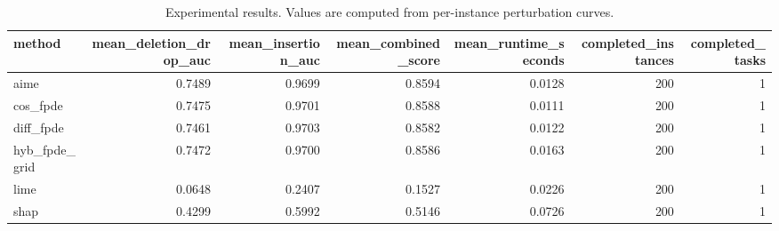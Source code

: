 \begin{table}[t]
\caption{Experimental results. Values are computed from per-instance perturbation curves.}
\label{tab:main_results_computed}
\centering
\begin{tabular}{lrrrrrr}
\toprule
method & mean\_deletion\_drop\_auc & mean\_insertion\_auc & mean\_combined\_score & mean\_runtime\_seconds & completed\_instances & completed\_tasks \\
\midrule
aime & 0.7489 & 0.9699 & 0.8594 & 0.0128 & 200 & 1 \\
cos\_fpde & 0.7475 & 0.9701 & 0.8588 & 0.0111 & 200 & 1 \\
diff\_fpde & 0.7461 & 0.9703 & 0.8582 & 0.0122 & 200 & 1 \\
hyb\_fpde\_grid & 0.7472 & 0.9700 & 0.8586 & 0.0163 & 200 & 1 \\
lime & 0.0648 & 0.2407 & 0.1527 & 0.0226 & 200 & 1 \\
shap & 0.4299 & 0.5992 & 0.5146 & 0.0726 & 200 & 1 \\
\bottomrule
\end{tabular}

\end{table}
